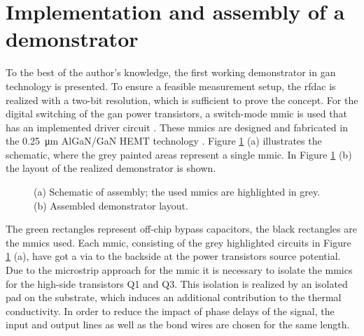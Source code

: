 \documentclass[journal]{IEEEtran}
\begin{document}
\section{Implementation and assembly of a demonstrator}
\label{sec:assembly}
To the best of the author's knowledge, the first working demonstrator in \gls{gan} technology is presented.
To ensure a feasible measurement setup, the \gls{rfdac} is realized with a two-bit resolution, which is sufficient to prove the concept.
For the digital switching of the \gls{gan} power transistors, a switch-mode \gls{mmic} is used that has an implemented driver circuit \cite{MaroldtBruecknerQuayEtAl2014}.
These \glspl{mmic} are designed and fabricated in the \SI{0.25}{\micro\meter} AlGaN/GaN HEMT technology \cite{MaroldtDriverConcept}.
Figure \ref{fig:assembled_demonstrator} (a) illustrates the schematic, where the grey painted areas represent a single \gls{mmic}.
In Figure \ref{fig:assembled_demonstrator} (b) the layout of the realized demonstrator is shown.
%
\begin{figure}[htb]
  \centering
	\begin{scriptsize}
  	\def\svgwidth{\columnwidth}
 	 
  	\caption{(a) Schematic of assembly; the used \glspl{mmic} are highlighted in grey. (b) Assembled demonstrator layout.}
  	\label{fig:assembled_demonstrator}
	\end{scriptsize}
\end{figure}
%
The green rectangles represent off-chip bypass capacitors, the black rectangles are the \glspl{mmic} used.
Each \gls{mmic}, consisting of the grey highlighted circuits in Figure \ref{fig:assembled_demonstrator} (a), have got a via to the backside 
at the power transistors source potential.
Due to the microstrip approach for the \gls{mmic} it is necessary to isolate the \glspl{mmic} for the high-side transistors Q1 and Q3.
This isolation is realized by an isolated pad on the substrate, which induces an additional contribution to the thermal conductivity.
In order to reduce the impact of phase delays of the signal, the input and output lines as well as the bond wires are chosen for the same length.
\end{document}
